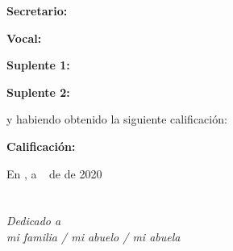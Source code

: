 \documentclass[a4paper, 12pt]{book}
\begin{document}
 \vspace{1.2cm}
 \textbf{Secretario:}

 \vspace{1.2cm}
 \textbf{Vocal:}

 \vspace{1.2cm}
 \textbf{Suplente 1:}

 \vspace{1.2cm}
 \textbf{Suplente 2:}


 \vspace{0.5cm}
 y habiendo obtenido la siguiente calificación:

 \vspace{1cm}
 \textbf{Calificación:}


 \vspace{1cm}
 \begin{flushright}
 En \lugar, a \qquad$\;\,$ de \qquad\qquad\qquad\qquad de 2020
 \end{flushright}



 \chapter*{}
 \begin{flushright}
 \textit{Dedicado a \\
 mi familia / mi abuelo / mi abuela}
 \end{flushright}


  

\end{document}
